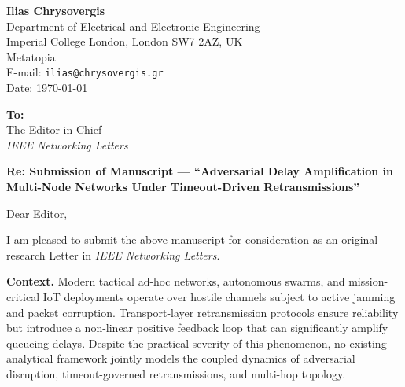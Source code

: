 \documentclass[11pt]{article}
\begin{document}
\noindent
\textbf{Ilias Chrysovergis} \\
Department of Electrical and Electronic Engineering \\
Imperial College London, London SW7 2AZ, UK \\
Metatopia \\
E-mail: \texttt{ilias@chrysovergis.gr} \\
Date: \today

\vspace{0.8em}

\noindent
\textbf{To:} \\
The Editor-in-Chief \\
\textit{IEEE Networking Letters}

\vspace{0.8em}

\noindent
\textbf{Re: Submission of Manuscript --- ``Adversarial Delay Amplification in Multi-Node Networks Under Timeout-Driven Retransmissions''}

\vspace{0.8em}

\noindent
Dear Editor,

\vspace{0.4em}
\noindent
I am pleased to submit the above manuscript for consideration as an original research Letter in \textit{IEEE Networking Letters}.

\vspace{0.4em}
\noindent
\textbf{Context.}
Modern tactical ad-hoc networks, autonomous swarms, and mission-critical IoT deployments operate over hostile channels subject to active jamming and packet corruption. Transport-layer retransmission protocols ensure reliability but introduce a non-linear positive feedback loop that can significantly amplify queueing delays. Despite the practical severity of this phenomenon, no existing analytical framework jointly models the coupled dynamics of adversarial disruption, timeout-governed retransmissions, and multi-hop topology.
\end{document}
